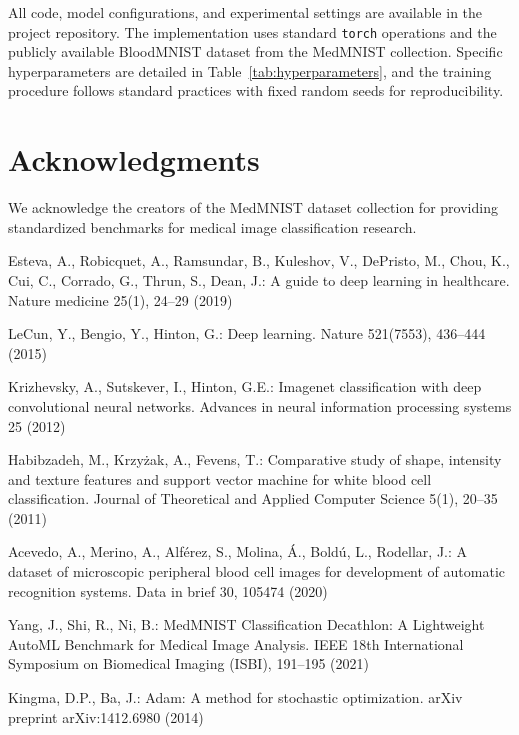 \documentclass[runningheads]{llncs}
\begin{document}
All code, model configurations, and experimental settings are available in the project repository. The implementation uses standard \texttt{torch} operations and the publicly available BloodMNIST dataset from the MedMNIST collection. Specific hyperparameters are detailed in Table~\ref{tab:hyperparameters}, and the training procedure follows standard practices with fixed random seeds for reproducibility.

\section*{Acknowledgments}

We acknowledge the creators of the MedMNIST dataset collection for providing standardized benchmarks for medical image classification research.

\begin{thebibliography}{10}

Esteva, A., Robicquet, A., Ramsundar, B., Kuleshov, V., DePristo, M., Chou, K., Cui, C., Corrado, G., Thrun, S., Dean, J.:
A guide to deep learning in healthcare.
Nature medicine 25(1), 24--29 (2019)

LeCun, Y., Bengio, Y., Hinton, G.:
Deep learning.
Nature 521(7553), 436--444 (2015)

Krizhevsky, A., Sutskever, I., Hinton, G.E.:
Imagenet classification with deep convolutional neural networks.
Advances in neural information processing systems 25 (2012)

Habibzadeh, M., Krzy{\.z}ak, A., Fevens, T.:
Comparative study of shape, intensity and texture features and support vector machine for white blood cell classification.
Journal of Theoretical and Applied Computer Science 5(1), 20--35 (2011)

Acevedo, A., Merino, A., Alférez, S., Molina, Á., Boldú, L., Rodellar, J.:
A dataset of microscopic peripheral blood cell images for development of automatic recognition systems.
Data in brief 30, 105474 (2020)

Yang, J., Shi, R., Ni, B.:
MedMNIST Classification Decathlon: A Lightweight AutoML Benchmark for Medical Image Analysis.
IEEE 18th International Symposium on Biomedical Imaging (ISBI), 191--195 (2021)

Kingma, D.P., Ba, J.:
Adam: A method for stochastic optimization.
arXiv preprint arXiv:1412.6980 (2014)

\end{thebibliography}
\end{document}
